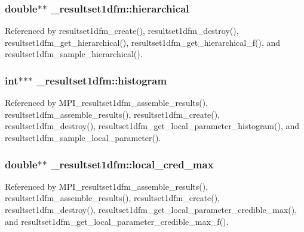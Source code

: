 \subsubsection[{\texorpdfstring{hierarchical}{hierarchical}}]{\setlength{\rightskip}{0pt plus 5cm}double$\ast$$\ast$ \+\_\+resultset1dfm\+::hierarchical}\hypertarget{struct__resultset1dfm_a0623b9e2d931dd305e86cb3580867143}{}\label{struct__resultset1dfm_a0623b9e2d931dd305e86cb3580867143}


Referenced by resultset1dfm\+\_\+create(), resultset1dfm\+\_\+destroy(), resultset1dfm\+\_\+get\+\_\+hierarchical(), resultset1dfm\+\_\+get\+\_\+hierarchical\+\_\+f(), and resultset1dfm\+\_\+sample\+\_\+hierarchical().

\subsubsection[{\texorpdfstring{histogram}{histogram}}]{\setlength{\rightskip}{0pt plus 5cm}int$\ast$$\ast$$\ast$ \+\_\+resultset1dfm\+::histogram}\hypertarget{struct__resultset1dfm_a14bbf9b5794558c13c2a3ba55304947a}{}\label{struct__resultset1dfm_a14bbf9b5794558c13c2a3ba55304947a}


Referenced by M\+P\+I\+\_\+resultset1dfm\+\_\+assemble\+\_\+results(), resultset1dfm\+\_\+assemble\+\_\+results(), resultset1dfm\+\_\+create(), resultset1dfm\+\_\+destroy(), resultset1dfm\+\_\+get\+\_\+local\+\_\+parameter\+\_\+histogram(), and resultset1dfm\+\_\+sample\+\_\+local\+\_\+parameter().

\subsubsection[{\texorpdfstring{local\+\_\+cred\+\_\+max}{local_cred_max}}]{\setlength{\rightskip}{0pt plus 5cm}double$\ast$$\ast$ \+\_\+resultset1dfm\+::local\+\_\+cred\+\_\+max}\hypertarget{struct__resultset1dfm_af48b2482fb58423ec1caeb2a94796e08}{}\label{struct__resultset1dfm_af48b2482fb58423ec1caeb2a94796e08}


Referenced by M\+P\+I\+\_\+resultset1dfm\+\_\+assemble\+\_\+results(), resultset1dfm\+\_\+assemble\+\_\+results(), resultset1dfm\+\_\+create(), resultset1dfm\+\_\+destroy(), resultset1dfm\+\_\+get\+\_\+local\+\_\+parameter\+\_\+credible\+\_\+max(), and resultset1dfm\+\_\+get\+\_\+local\+\_\+parameter\+\_\+credible\+\_\+max\+\_\+f().

